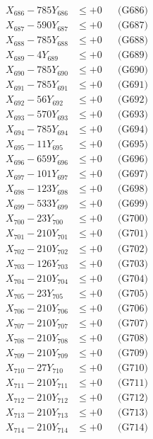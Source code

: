 \documentclass[a4paper,10pt]{article}
\begin{document}
{\begin{align}
X_{686} - 785Y_{686} &\leq +0 && \text{(G686)} \\
X_{687} - 590Y_{687} &\leq +0 && \text{(G687)} \\
X_{688} - 785Y_{688} &\leq +0 && \text{(G688)} \\
X_{689} - 4Y_{689} &\leq +0 && \text{(G689)} \\
X_{690} - 785Y_{690} &\leq +0 && \text{(G690)} \\
\allowbreak
X_{691} - 785Y_{691} &\leq +0 && \text{(G691)} \\
X_{692} - 56Y_{692} &\leq +0 && \text{(G692)} \\
X_{693} - 570Y_{693} &\leq +0 && \text{(G693)} \\
X_{694} - 785Y_{694} &\leq +0 && \text{(G694)} \\
X_{695} - 11Y_{695} &\leq +0 && \text{(G695)} \\
X_{696} - 659Y_{696} &\leq +0 && \text{(G696)} \\
X_{697} - 101Y_{697} &\leq +0 && \text{(G697)} \\
X_{698} - 123Y_{698} &\leq +0 && \text{(G698)} \\
X_{699} - 533Y_{699} &\leq +0 && \text{(G699)} \\
X_{700} - 23Y_{700} &\leq +0 && \text{(G700)} \\
\allowbreak
X_{701} - 210Y_{701} &\leq +0 && \text{(G701)} \\
X_{702} - 210Y_{702} &\leq +0 && \text{(G702)} \\
X_{703} - 126Y_{703} &\leq +0 && \text{(G703)} \\
X_{704} - 210Y_{704} &\leq +0 && \text{(G704)} \\
X_{705} - 23Y_{705} &\leq +0 && \text{(G705)} \\
X_{706} - 210Y_{706} &\leq +0 && \text{(G706)} \\
X_{707} - 210Y_{707} &\leq +0 && \text{(G707)} \\
X_{708} - 210Y_{708} &\leq +0 && \text{(G708)} \\
X_{709} - 210Y_{709} &\leq +0 && \text{(G709)} \\
X_{710} - 27Y_{710} &\leq +0 && \text{(G710)} \\
\allowbreak
X_{711} - 210Y_{711} &\leq +0 && \text{(G711)} \\
X_{712} - 210Y_{712} &\leq +0 && \text{(G712)} \\
X_{713} - 210Y_{713} &\leq +0 && \text{(G713)} \\
X_{714} - 210Y_{714} &\leq +0 && \text{(G714)} \\

\end{align}}
\end{document}
